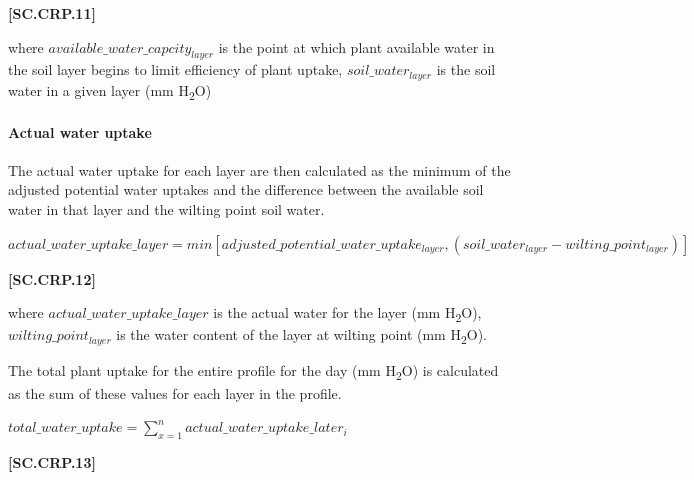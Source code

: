             {\raggedleft \textbf{[SC.CRP.11]}\par}
            \vspace{0.5cm}

where \(available\_water\_capcity_{layer}\) is the point at which plant available water in the soil layer begins to limit efficiency of plant uptake,  \(soil\_water_{layer}\) is the soil water in a given layer (mm H\textsubscript{2}O)

\paragraph{Actual water uptake}
\vspace{-0.25cm}

The actual water uptake for each layer  are then calculated as the minimum of the adjusted potential water uptakes and the difference between the available soil water in that layer and the wilting point soil water. 
    \vspace{0.2cm}

    \begin{center}
        \(actual\_water\_uptake\_layer = min[adjusted\_potential\_water\_uptake_{layer}, (soil\_water_{layer} - wilting\_point_{layer})] \)
    \end{center}
        \vspace{0.5cm}
    
            {\raggedleft \textbf{[SC.CRP.12]}\par}
            \vspace{0.5cm}

where \(actual\_water\_uptake\_layer\) is the actual water for the layer (mm H\textsubscript{2}O), \(wilting\_point_{layer}\) is the water content of the layer at wilting point (mm H\textsubscript{2}O). 

The total plant uptake for the entire profile for the day (mm H\textsubscript{2}O) is calculated as the sum of these values for each layer in the profile.
    \vspace{0.2cm}

    \begin{center}
        \(total\_water\_uptake =\displaystyle \sum_{x=1}^{n} 
actual\_water\_uptake\_later_i\)
    \end{center}
        \vspace{0.5cm}
    
            {\raggedleft \textbf{[SC.CRP.13]}\par}
            \vspace{0.5cm}

